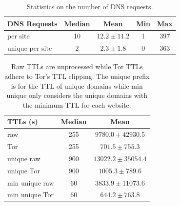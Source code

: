 \begin{table}[t]
	\centering
	\begin{tabular}{l c c c c}
	\toprule
	\textbf{DNS Requests} & \textbf{Median} & \textbf{Mean} & \textbf{Min} & \textbf{Max} \\
	\midrule
	per site & 10 & $12.2\pm11.2$ & 1 & 397 \\
	unique per site & 2 & $2.3\pm1.8$ & 0 & 363 \\
	\bottomrule
	\end{tabular}
	\caption{Statistics on the number of DNS requests.}
	\label{tab:daw-unique}
\end{table}


\begin{table}[t]
	\centering
	\begin{tabular}{l c c}
	\toprule
	\textbf{TTLs (s)} & \textbf{Median} & \textbf{Mean} \\
	\midrule
	raw & 255 & $9780.0\pm42930.5$ \\ %
	Tor & 255 & $701.5\pm755.3$ \\ %
	unique raw & 900 & $13022.2\pm35054.4$ \\ %
	unique Tor & 900 & $1005.3\pm789.6$ \\ %
	min unique raw & 60 & $3833.9\pm11073.6$ \\ %
	min unique Tor & 60 & $644.2\pm763.8$ \\ %
	\bottomrule
	\end{tabular}
	\caption{%
	Raw TTLs are unprocessed while Tor TTLs adhere to Tor's TTL clipping.
	The unique prefix is for the TTL of unique domains while min unique only
	considers the unique domains with the minimum TTL for each website.}
	\label{tab:daw-ttls}
\end{table}


